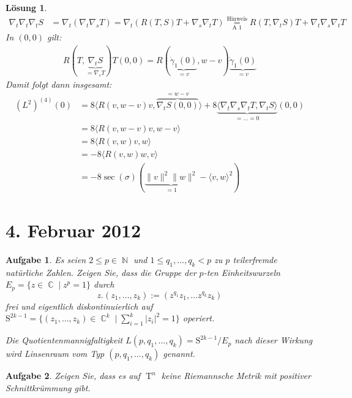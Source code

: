 \documentclass[paper=A4, twoside, chapterprefix=true, bibliography=totoc, headsepline]{scrbook}
\DeclareMathOperator{\C}{\mathbb{C}}
\DeclareMathOperator{\N}{\mathbb{N}}
\DeclareMathOperator{\T}{T} %
\theoremstyle{plain}
\theoremstyle{nonumberplain}
\theoremstyle{empty}
\theoremstyle{break}
\newtheorem{Aufg}{Aufgabe}
\newtheorem{Loes}{L\"osung}
\begin{document}
\begin{Loes}
\begin{align*}
	\nabla_t\nabla_t\nabla_t S &= \nabla_t (\nabla_t \nabla_s T) = \nabla_t (R(T,S)T + \nabla_s \nabla_t T) \overset{\text{Hinweis}}{\underset{\text{A 1}}{=}} R(T, \nabla_t S) T + \nabla_t \nabla_s \nabla_t T
\end{align*}
In $(0,0)$ gilt:
\begin{align*}
	R (T, \underbrace{\nabla_t S}_{= \nabla_s T}) T (0,0) = R(\underbrace{\dot\gamma_1(0)}_{=v}, w - v) \underbrace{\dot\gamma_1(0)}_{=v}
\end{align*}
Damit folgt dann insgesamt:
\begin{align*}
	(L^2)^{(4)}(0) &= 8 \langle R(v, w - v) v, \overbrace{\nabla_t S(0,0)}^{=w-v} \rangle + 8 \underbrace{\langle \nabla_t\nabla_s\nabla_t T, \nabla_t S \rangle}_{= \ldots = 0} (0,0) \\
	&= 8 \langle R(v, w - v) v, w - v \rangle \\
	&= 8 \langle R(v, w) v, w \rangle \\
	&= -8 \langle R(v, w) w, v \rangle \\
	&= -8 \sec(\sigma) (\underbrace{\|v\|^2 \|w\|^2}_{=1} - \langle v, w \rangle^2)
\end{align*}
\end{Loes}


\section{4. Februar 2012}
\setcounter{Aufg}{0} %
\setcounter{Loes}{0}

\begin{Aufg}
Es seien $2\leq p \in \N$ und $1\leq q_1,\dots,q_k<p$ zu $p$ teilerfremde natürliche Zahlen. Zeigen Sie, dass die Gruppe der $p$-ten Einheitswurzeln $E_p=\{z \in \C \mid z^p=1\}$ durch
	\[z.(z_1,\dots, z_k):=(z^{q_1}z_1,\dots z^{q_k} z_k)\]
frei und eigentlich diskontinuierlich auf $\mathrm{S}^{2k-1}=\{(z_1, \dots, z_k) \in \C^k \mid \sum_{i=1}^k |z_i|^2 =1\}$ operiert.

Die Quotientenmannigfaltigkeit $L(p,q_1,\dots, q_k)=\mathrm{S}^{2k-1}/E_p$ nach dieser Wirkung wird \emph{Linsenraum} vom Typ $(p,q_1,\dots,q_k)$ genannt.
\end{Aufg}

\begin{Aufg}
Zeigen Sie, dass es auf $\T^n$ keine Riemannsche Metrik mit positiver Schnittkrümmung gibt.
\end{Aufg}
\end{document}
